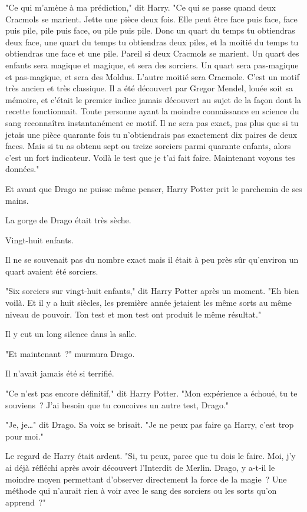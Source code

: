 "Ce qui m'amène à ma prédiction," dit Harry. "Ce qui se passe quand deux Cracmols se marient. Jette une pièce deux fois. Elle peut être face puis face, face puis pile, pile puis face, ou pile puis pile. Donc un quart du temps tu obtiendras deux face, une quart du temps tu obtiendras deux piles, et la moitié du temps tu obtiendras une face et une pile. Pareil si deux Cracmols se marient. Un quart des enfants sera magique et magique, et sera des sorciers. Un quart sera pas-magique et pas-magique, et sera des Moldus. L'autre moitié sera Cracmole. C'est un motif très ancien et très classique. Il a été découvert par Gregor Mendel, louée soit sa mémoire, et c'était le premier indice jamais découvert au sujet de la façon dont la recette fonctionnait. Toute personne ayant la moindre connaissance en science du sang reconnaîtra instantanément ce motif. Il ne sera pas exact, pas plus que si tu jetais une pièce quarante fois tu n'obtiendrais pas exactement dix paires de deux faces. Mais si tu as obtenu sept ou treize sorciers parmi quarante enfants, alors c'est un fort indicateur. Voilà le test que je t'ai fait faire. Maintenant voyons tes données."

Et avant que Drago ne puisse même penser, Harry Potter prit le parchemin de ses mains.

La gorge de Drago était très sèche.

Vingt-huit enfants.

Il ne se souvenait pas du nombre exact mais il était à peu près sûr qu'environ un quart avaient été sorciers.

"Six sorciers sur vingt-huit enfants," dit Harry Potter après un moment. "Eh bien voilà. Et il y a huit siècles, les première année jetaient les même sorts au même niveau de pouvoir. Ton test et mon test ont produit le même résultat."

Il y eut un long silence dans la salle.

"Et maintenant~?" murmura Drago.

Il n'avait jamais été si terrifié.

"Ce n'est pas encore définitif," dit Harry Potter. "Mon expérience a échoué, tu te souviens~? J'ai besoin que tu concoives un autre test, Drago."

"Je, je…" dit Drago. Sa voix se brisait. "Je ne peux pas faire ça Harry, c'est trop pour moi."

Le regard de Harry était ardent. "Si, tu peux, parce que tu dois le faire. Moi, j'y ai déjà réfléchi après avoir découvert l'Interdit de Merlin. Drago, y a-t-il le moindre moyen permettant d'observer directement la force de la magie~? Une méthode qui n'aurait rien à voir avec le sang des sorciers ou les sorts qu'on apprend~?"

